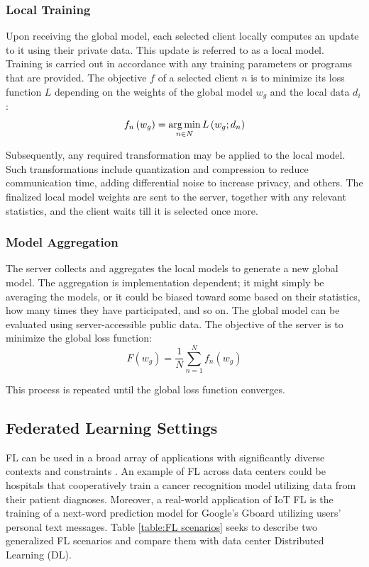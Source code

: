 \subsubsection{Local Training} %
Upon receiving the global model, each selected client locally computes an update to it using their private data. This update is referred to as a local model. Training is carried out in accordance with any training parameters or programs that are provided. The objective \(f\) of a selected client \(n\) is to minimize its loss function \(L\) depending on the weights of the global model \(w_g\) and the local data \(d_i\):
\begin{equation}
    f_n \left( w_g \right) = \operatorname*{arg\,min}_{n\in N} L\left( w_g ; d_n \right)
	\label{eqn:FL, Objective of a selected client}
\end{equation}

Subsequently, any required transformation may be applied to the local model. Such transformations include quantization and compression to reduce communication time, adding differential noise to increase privacy, and others. The finalized local model weights are sent to the server, together with any relevant statistics, and the client waits till it is selected once more.

\subsubsection{Model Aggregation} %
The server collects and aggregates the local models to generate a new global model. The aggregation is implementation dependent; it might simply be averaging the models, or it could be biased toward some based on their statistics, how many times they have participated, and so on. The global model can be evaluated using server-accessible public data. The objective of the server is to minimize the global loss function:
\begin{equation}
    F \left( w_g \right) = \frac{1}{N} \sum_{n=1}^N f_n \left( w_g \right)
	\label{eqn:FL, Objective of the server}
\end{equation}

This process is repeated until the global loss function converges.%

\subsection{Federated Learning Settings} %
FL can be used in a broad array of applications with significantly diverse contexts and constraints \cite{survey_B, survey_D}. An example of FL across data centers could be hospitals that cooperatively train a cancer recognition model utilizing data from their patient diagnoses. Moreover, a real-world application of IoT FL is the training of a next-word prediction model for Google's Gboard \cite{GBoard_FL} utilizing users' personal text messages. Table \ref{table:FL scenarios} seeks to describe two generalized FL scenarios and compare them with data center Distributed Learning (DL).

